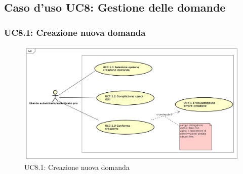 \subsection{Caso d'uso UC8: Gestione delle domande}
	
\subsubsection{UC8.1: Creazione nuova domanda}
	\label{UC8.1}
	\begin{figure}[h]
		\centering
			\includegraphics[scale=0.45,keepaspectratio]{UML/UC8_1.png}
		\caption{UC8.1: Creazione nuova domanda}
	\end{figure}
	\FloatBarrier
